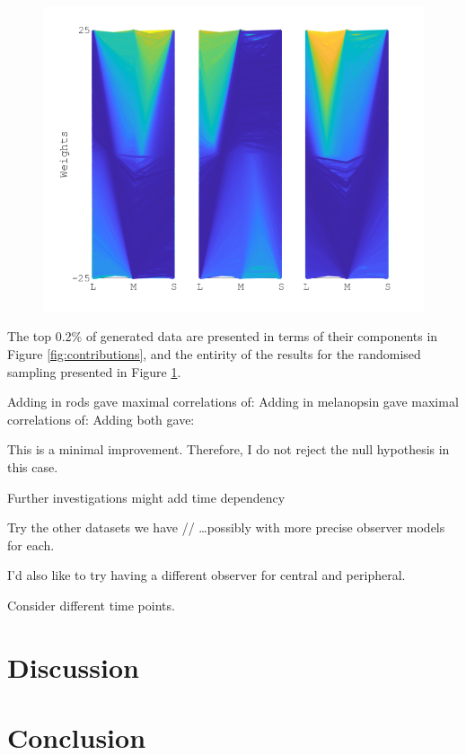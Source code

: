 \begin{figure}[htbp]
\includegraphics[max width=\textwidth]{figs/LargeSphere/contributions_all.pdf}
\caption{}
\label{fig:contributions_all}
\end{figure}

The top 0.2\% of generated data are presented in terms of their components in Figure \ref{fig:contributions}, and the entirity of the results for the randomised sampling presented in Figure \ref{fig:contributions_all}.

Adding in rods gave maximal correlations of: 
Adding in melanopsin gave maximal correlations of:
Adding both gave:

This is a minimal improvement. Therefore, I do not reject the null hypothesis in this case.

Further investigations might add time dependency

Try the other datasets we have //
\dots possibly with more precise observer models for each.

I’d also like to try having a different observer for central and peripheral.

Consider different time points.	




\section{Discussion}
\section{Conclusion}